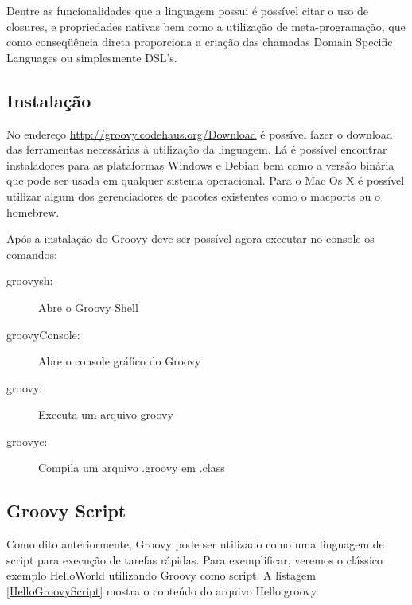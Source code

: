 \documentclass[12pt]{article}
\begin{document}
    Dentre as funcionalidades que a linguagem possui é possível citar o uso de 
    closures,  e propriedades nativas bem como a utilização de meta-programação, 
    que como conseqüência direta proporciona a criação das chamadas Domain 
    Specific Languages ou simplesmente DSL's.

\subsection{Instalação}
    
    No endereço \url{http://groovy.codehaus.org/Download} é possível fazer o 
    download das ferramentas necessárias à utilização da linguagem. Lá é possível
    encontrar instaladores para as plataformas Windows e Debian bem como a versão
    binária que pode ser usada em qualquer sistema operacional. Para o Mac Os X 
    é possível utilizar algum dos gerenciadores de pacotes existentes como o 
    macports ou o homebrew.

%    
    
    Após a instalação do Groovy deve ser possível agora executar no console os comandos:
    
    \begin{description}
        \item [groovysh:] Abre o Groovy Shell
        \item [groovyConsole:] Abre o console gráfico do Groovy 
        \item [groovy:] Executa um arquivo groovy
        \item [groovyc:] Compila um arquivo .groovy em .class
    \end{description}
    
\subsection{Groovy Script}
    
    Como dito anteriormente, Groovy pode ser utilizado como uma linguagem de 
    script para execução de tarefas rápidas. Para exemplificar, veremos o clássico
    exemplo HelloWorld utilizando Groovy como script. A listagem \ref{HelloGroovyScript}
    mostra o conteúdo do arquivo Hello.groovy. 
    
\end{document}
